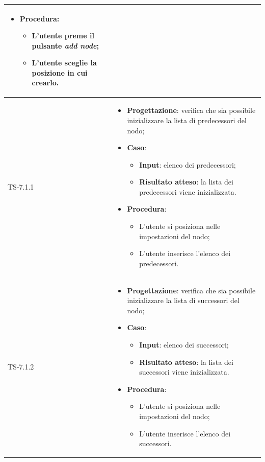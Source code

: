 \begin{longtable}{|C{2.5cm}|C{13cm}|}
\begin{itemize}
	\item \textbf{Procedura}:
	\begin{itemize}
		\item L'utente preme il pulsante \emph{add node};
		\item L'utente sceglie la posizione in cui crearlo.
	\end{itemize} 
\end{itemize} \\
\hline
	{TS-7.1.1} &
\begin{itemize}
	\item \textbf{Progettazione}: verifica che sia possibile inizializzare la lista di predecessori del nodo;
	\item \textbf{Caso}: 
	\begin{itemize}
		\item \textbf{Input}: elenco dei predecessori;
		\item \textbf{Risultato atteso}: la lista dei predecessori viene inizializzata.
	\end{itemize}
	\item \textbf{Procedura}:
	\begin{itemize}
		\item L'utente si posiziona nelle impostazioni del nodo;
		\item L'utente inserisce l'elenco dei predecessori.
	\end{itemize} 
\end{itemize}
	  \\
	\hline
	{TS-7.1.2} & 
\begin{itemize}
	\item \textbf{Progettazione}: verifica che sia possibile inizializzare la lista di successori del nodo;
	\item \textbf{Caso}: 
	\begin{itemize}
		\item \textbf{Input}: elenco dei successori;
		\item \textbf{Risultato atteso}: la lista dei successori viene inizializzata.
	\end{itemize}
	\item \textbf{Procedura}:
	\begin{itemize}
		\item L'utente si posiziona nelle impostazioni del nodo;
		\item L'utente inserisce l'elenco dei successori.
	\end{itemize} 
\end{itemize}
	  \\

\end{longtable}
